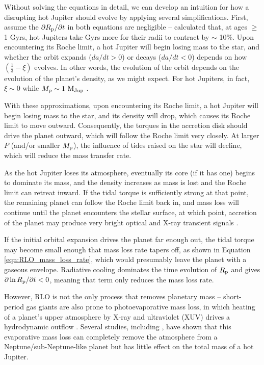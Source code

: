 \documentclass{svjour3}                     %
\begin{document}
Without solving the equations in detail, we can develop an intuition for how a disrupting hot Jupiter should evolve by applying several simplifications. First, assume the $\partial R_{\rm p}/\partial t$ in both equations are negligible -- \cite{Arras2006Thermal} calculated that, at ages $\geq$ 1 Gyrs, hot Jupiters take Gyrs more for their radii to contract by $\sim$ 10\%. Upon encountering its Roche limit, a hot Jupiter will begin losing mass to the star, and whether the orbit expands ($da/dt > 0$) or decays ($da/dt < 0$) depends on how $\left( \frac{1}{3} - \xi \right)$ evolves. In other words, the evolution of the orbit depends on the evolution of the planet's density, as we might expect. For hot Jupiters, in fact, $\xi \sim 0$ while $M_{\rm p} \sim 1\ {\rm M_{Jup}}$ \cite{Fortney2007Planetary}. 

With these approximations, upon encountering its Roche limit, a hot Jupiter will begin losing mass to the star, and its density will drop, which causes its Roche limit to move outward. Consequently, the torques in the accretion disk should drive the planet outward, which will follow the Roche limit very closely. At larger $P$ (and/or smaller $M_{\rm p}$), the influence of tides raised on the star will decline, which will reduce the mass transfer rate. 

As the hot Jupiter loses its atmosphere, eventually its core (if it has one) begins to dominate its mass, and the density increases as mass is lost and the Roche limit can retreat inward. If the tidal torque is sufficiently strong at that point, the remaining planet can follow the Roche limit back in, and mass loss will continue until the planet encounters the stellar surface, at which point, accretion of the planet may produce very bright optical and X-ray transient signals \cite{2012MNRAS.425.2778M}. 

If the initial orbital expansion drives the planet far enough out, the tidal torque may become small enough that mass loss rate tapers off, as shown in Equation \ref{eqn:RLO_mass_loss_rate}, which would presumably leave the planet with a gaseous envelope. Radiative cooling dominates the time evolution of $R_{\rm p}$ and gives $\partial \ln R_{\rm p}/\partial t < 0$, meaning that term only reduces the mass loss rate.

However, RLO is not the only process that removes planetary mass -- short-period gas giants are also prone to photoevaporative mass loss, in which heating of a planet's upper atmosphere by X-ray and ultraviolet (XUV) drives a hydrodynamic outflow  \cite{VidalMadjar2003Extended,2014ApJ...783...54K}. Several studies, including \cite{Lopez2013Role}, have shown that this evaporative mass loss can completely remove the atmosphere from a Neptune/sub-Neptune-like planet but has little effect on the total mass of a hot Jupiter. 
\end{document}
